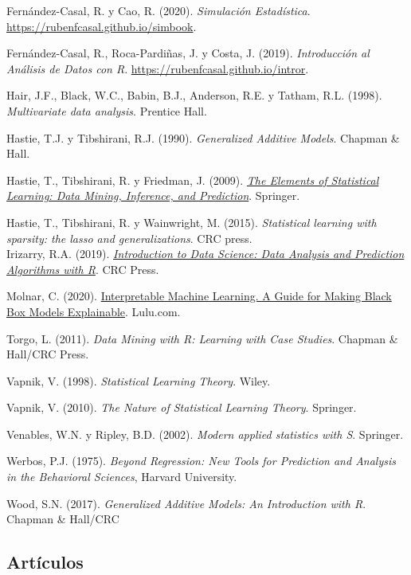 \documentclass[
]{book}
\theoremstyle{break}
\theoremstyle{definition}
\theoremstyle{definition}
\theoremstyle{definition}
\theoremstyle{remark}
\begin{document}
Fernández-Casal, R. y Cao, R. (2020). \emph{Simulación Estadística}. \url{https://rubenfcasal.github.io/simbook}.

Fernández-Casal, R., Roca-Pardiñas, J. y Costa, J. (2019). \emph{Introducción al Análisis de Datos con R}. \url{https://rubenfcasal.github.io/intror}.

Hair, J.F., Black, W.C., Babin, B.J., Anderson, R.E. y Tatham, R.L. (1998). \emph{Multivariate data analysis}. Prentice Hall.

Hastie, T.J. y Tibshirani, R.J. (1990). \emph{Generalized Additive Models}. Chapman \& Hall.

Hastie, T., Tibshirani, R. y Friedman, J. (2009).
\emph{\href{https://web.stanford.edu/~hastie/ElemStatLearn}{The Elements of Statistical Learning: Data Mining, Inference, and Prediction}}. Springer.

Hastie, T., Tibshirani, R. y Wainwright, M. (2015). \emph{Statistical learning with sparsity: the lasso and generalizations}. CRC press.\\
Irizarry, R.A. (2019). \emph{\href{https://rafalab.github.io/dsbook}{Introduction to Data Science: Data Analysis and Prediction Algorithms with R}}. CRC Press.

Molnar, C. (2020). \href{https://christophm.github.io/interpretable-ml-book}{Interpretable Machine Learning. A Guide for Making Black Box Models Explainable}. Lulu.com.

Torgo, L. (2011). \emph{Data Mining with R: Learning with Case Studies}. Chapman \& Hall/CRC Press.

Vapnik, V. (1998). \emph{Statistical Learning Theory}. Wiley.

Vapnik, V. (2010). \emph{The Nature of Statistical Learning Theory}. Springer.

Venables, W.N. y Ripley, B.D. (2002). \emph{Modern applied statistics with S}. Springer.

Werbos, P.J. (1975). \emph{Beyond Regression: New Tools for Prediction and Analysis in the Behavioral Sciences}, Harvard University.

Wood, S.N. (2017). \emph{Generalized Additive Models: An Introduction with R}. Chapman \& Hall/CRC

\hypertarget{artuxedculos}{%
\subsection*{Artículos}\label{artuxedculos}}
\end{document}
